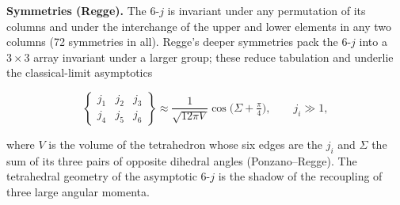 \medskip\noindent\textbf{Symmetries (Regge).} The 6-$j$ is invariant under any permutation of its columns and under the interchange of the upper and lower elements in any two columns (72 symmetries in all). Regge's deeper symmetries pack the 6-$j$ into a $3\times3$ array invariant under a larger group; these reduce tabulation and underlie the classical-limit asymptotics
\begin{linenomath}
\begin{equation}
\begin{Bmatrix}j_{1}&j_{2}&j_{3}\\ j_{4}&j_{5}&j_{6}\end{Bmatrix}\approx\frac{1}{\sqrt{12\pi V}}\cos\!\bigl(\Sigma+\tfrac{\pi}{4}\bigr),\qquad j_{i}\gg1,
\label{eq:6j-asymptotic}
\end{equation}
\end{linenomath}
where $V$ is the volume of the tetrahedron whose six edges are the $j_{i}$ and $\Sigma$ the sum of its three pairs of opposite dihedral angles (Ponzano--Regge). The tetrahedral geometry of the asymptotic 6-$j$ is the shadow of the recoupling of three large angular momenta.

